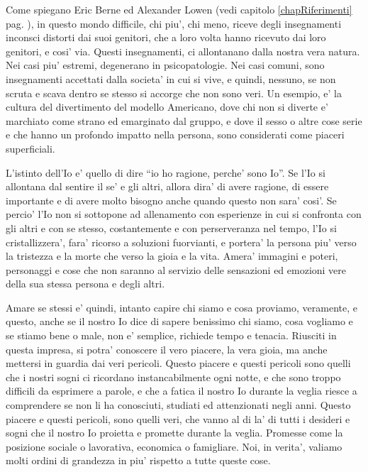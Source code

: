 Come spiegano Eric Berne ed Alexander Lowen (vedi capitolo \ref{chapRiferimenti} pag. \pageref{chapRiferimenti}), in questo mondo difficile, chi piu', chi meno, riceve degli insegnamenti inconsci distorti dai suoi genitori, che a loro volta hanno ricevuto dai loro genitori, e cosi' via. Questi insegnamenti, ci allontanano dalla nostra vera natura. Nei casi piu' estremi, degenerano in psicopatologie. Nei casi comuni, sono insegnamenti accettati dalla societa' in cui si vive, e quindi, nessuno, se non scruta e scava dentro se stesso si accorge che non sono veri. Un esempio, e' la cultura del divertimento del modello Americano, dove chi non si diverte e' marchiato come strano ed emarginato dal gruppo, e dove il sesso o altre cose serie e che hanno un profondo impatto nella persona, sono considerati come piaceri superficiali.

L'istinto dell'Io e' quello di dire ``io ho ragione, perche' sono Io''. Se l'Io si allontana dal sentire il se' e gli altri, allora dira' di avere ragione, di essere importante e di avere molto bisogno anche quando questo non sara' cosi'. Se percio' l'Io non si sottopone ad allenamento con esperienze in cui si confronta con gli altri e con se stesso, costantemente e con perserveranza nel tempo, l'Io si cristallizzera', fara' ricorso a soluzioni fuorvianti, e portera' la persona piu' verso la tristezza e la morte che verso la gioia e la vita. Amera' immagini e poteri, personaggi e cose che non saranno al servizio delle sensazioni ed emozioni vere della sua stessa persona e degli altri.

Amare se stessi e' quindi, intanto capire chi siamo e cosa proviamo, veramente, e questo, anche se il nostro Io dice di sapere benissimo chi siamo, cosa vogliamo e se stiamo bene o male, non e' semplice, richiede tempo e tenacia. Riusciti in questa impresa, si potra' conoscere il vero piacere, la vera gioia, ma anche mettersi in guardia dai veri pericoli. Questo piacere e questi pericoli sono quelli che i nostri sogni ci ricordano instancabilmente ogni notte, e che sono troppo difficili da esprimere a parole, e che a fatica il nostro Io durante la veglia riesce a comprendere se non li ha conosciuti, studiati ed attenzionati negli anni. Questo piacere e questi pericoli, sono quelli veri, che vanno al di la' di tutti i desideri e sogni che il nostro Io proietta e promette durante la veglia. Promesse come la posizione sociale o lavorativa, economica o famigliare. Noi, in verita', valiamo molti ordini di grandezza in piu' rispetto a tutte queste cose.


